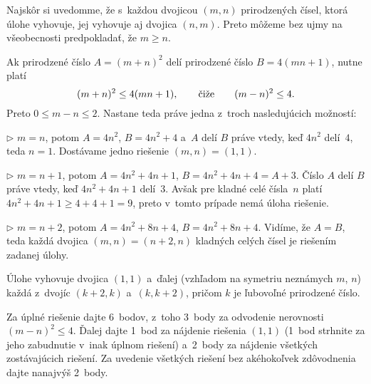 {%
Najskôr si uvedomme, že s~každou dvojicou $(m,n)$ prirodzených čísel, ktorá úlohe
vyhovuje, jej vyhovuje aj dvojica $(n,m)$.
Preto môžeme bez ujmy na všeobecnosti predpokladať, že $m\ge n$.

Ak prirodzené číslo $A=(m+n)^2$ delí prirodzené číslo $B=4(mn+1)$,
nutne platí
$$
(m+n)^2\le 4(mn+1),\qquad \hbox{čiže}\qquad (m-n)^2\le4.
$$
Preto $0\le m-n\le 2$. Nastane teda práve jedna z~troch nasledujúcich
možností:
\item{$\triangleright$}
$m=n$, potom $A=4n^2$, $B=4n^2+4$ a~$A$ delí $B$
práve vtedy, keď $4n^2$ delí~$4$, teda $n=1$. Dostávame jedno riešenie
$(m,n)=(1,1)$.
\item{$\triangleright$}
$m=n+1$, potom $A=4n^2+4n+1$, $B=4n^2+4n+4=A+3$.
Číslo $A$ delí $B$ práve vtedy, keď $4n^2+4n+1$ delí~$3$. Avšak pre kladné
celé čísla~$n$ platí ${4n^2+4n+1}\ge 4+4+1=9$, preto v~tomto
prípade nemá úloha riešenie.
\item{$\triangleright$}
$m=n+2$, potom $A=4n^2+8n+4$, $B=4n^2+8n+4$.
Vidíme, že $A=B$, teda každá dvojica $(m,n)=(n+2,n)$ kladných celých čísel
je riešením zadanej úlohy.

\zaver
Úlohe vyhovuje dvojica $(1,1)$ a~ďalej (vzhľadom na symetriu
neznámych $m$, $n$) každá z~dvojíc $(k+2,k)$ a~$(k,k+2)$, pričom $k$ je ľubovoľné prirodzené číslo.


\nobreak\medskip\petit\noindent
Za úplné riešenie dajte 6~bodov, z~toho 3~body za odvodenie nerovnosti
$(m-n)^2\le4$. Ďalej dajte 1~bod za nájdenie riešenia $(1,1)$ (1~bod strhnite
za jeho zabudnutie v~inak úplnom riešení) a~2~body za
nájdenie všetkých zostávajúcich riešení. Za uvedenie všetkých riešení bez akéhokoľvek
zdôvodnenia dajte nanajvýš 2~body.
\endpetit
\bigbreak
}

